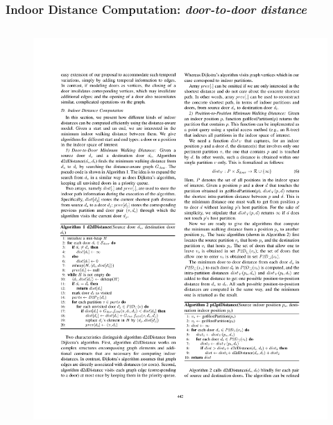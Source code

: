\begin{frame}
\frametitle{Indoor Distance Computation: \emph{door-to-door distance}}

\begin{columns}[c]

  \begin{figure}[tb]
    \includegraphics[width=\columnwidth]{figures/2-5/2-5-3.pdf}
  \end{figure}



\end{columns}

\end{frame}


